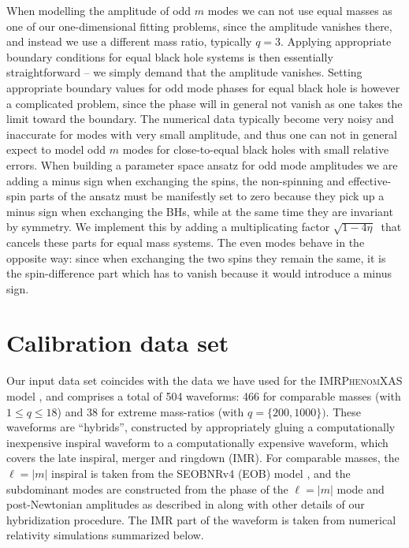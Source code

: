 \documentclass[twocolumn,prd,aps,superscriptaddress,preprintnumbers,tightenlines,showpacs,nofootinbib,eqsecnum,amsfonts,amsmath]{revtex4}
\newcommand{\phX}{\textsc{IMRPhenomXAS}\xspace}
\begin{document}
When modelling the amplitude of odd $m$ modes we can not use equal masses as one of our one-dimensional fitting problems, since the amplitude vanishes there, and instead we use a different mass ratio, typically $q=3$. Applying appropriate boundary conditions for equal black hole systems is then essentially straightforward -- we simply demand that the amplitude vanishes.
Setting appropriate boundary values for odd mode phases
for equal black hole is however a complicated problem, since the phase will in general not vanish as one takes the limit toward the boundary. The numerical data typically become very noisy and inaccurate for modes with very small amplitude, and thus one can not in general expect to model odd $m$ modes for close-to-equal black holes with small relative errors.
%
When building a parameter space ansatz for odd mode amplitudes we are adding a minus sign when exchanging the spins, the non-spinning and effective-spin parts of the ansatz must be manifestly set to zero because they pick up a minus sign when exchanging the BHs, while at the same time they are invariant by symmetry. We implement this
 by adding a multiplicating factor $\sqrt{1-4\eta}\:$ that cancels these parts for equal mass  systems. The even modes behave in the opposite way: since when exchanging the two spins they remain the same, it is the spin-difference part which has to vanish because it would introduce a minus sign. 


\section{Calibration data set} \label{sec:input}

Our input data set coincides with the data we have used for the \phX model \cite{phenX}, and
comprises a total of 504 waveforms: 466 for 
comparable masses (with $1\leq q \leq 18$) and 38 for extreme mass-ratios (with $q=\{200,1000\})$.    
%
These waveforms are ``hybrids'', constructed by appropriately gluing a computationally inexpensive inspiral waveform to a computationally expensive waveform, which covers the late inspiral, merger and ringdown (IMR).
For comparable masses, the $\ell=\vert m\vert$ inspiral is taken
from the SEOBNRv4 (EOB) model \cite{Taracchini:2014zpa}, and the subdominant modes are constructed from the phase of the $\ell=\vert m\vert$ mode and post-Newtonian amplitudes as described in \cite{hybrids} along with other details of our hybridization procedure. The IMR part of the waveform is taken from numerical relativity simulations summarized below.
\end{document}
